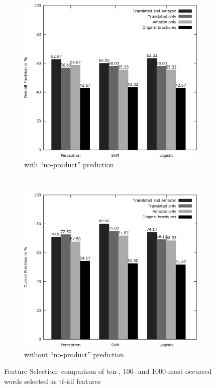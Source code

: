 \begin{figure}
	\centering
	\begin{subfigure}[t]{0.5\textwidth}
		\includegraphics[width=\textwidth]{figures/product_translate_amazon_with_none.eps}
		\caption{with ``no-product'' prediction}
	\end{subfigure}~
	\begin{subfigure}[t]{0.5\textwidth}
		\includegraphics[width=\textwidth]{figures/product_translate_amazon_without_none.eps}
		\caption{without ``no-product'' prediction}
	\end{subfigure}
	\caption{Feature Selection: comparison of ten-, 100- and 1000-most occurred words selected as tf-idf features}
	\label{fig:product_translate_amazon}
\end{figure}

